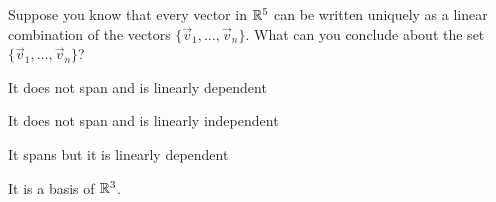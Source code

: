 \documentclass{article}[12pt]
\begin{document}
\begin{readinessAssuranceTest}
\item Suppose you know that every vector in $\mathbb{R}^5$ can be written uniquely as a linear combination of the vectors $\{\vec{v}_1, \ldots, \vec{v}_n\}$.  What can you conclude about the set $\{\vec{v}_1, \ldots, \vec{v}_n\}$?

\begin{readinessAssuranceTestChoices}
\item It does not span and is linearly dependent
\item It does not span and is linearly independent
\item It spans but it is linearly dependent
\item It is a basis of $\mathbb{R}^3$.
\end{readinessAssuranceTestChoices}

\end{readinessAssuranceTest}
\end{document}
